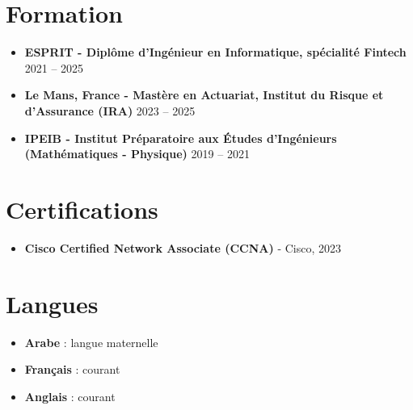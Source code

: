 \documentclass[10pt,a4paper]{article}
\begin{document}
\section{Formation}
\begin{itemize}
    \item \textbf{ESPRIT - Diplôme d'Ingénieur en Informatique, spécialité Fintech} \hfill 2021 -- 2025
    \item \textbf{Le Mans, France - Mastère en Actuariat, Institut du Risque et d'Assurance (IRA)} \hfill 2023 -- 2025
    \item \textbf{IPEIB - Institut Préparatoire aux Études d'Ingénieurs (Mathématiques - Physique)} \hfill 2019 -- 2021
\end{itemize}

\section{Certifications}
\begin{itemize}
    \item \textbf{Cisco Certified Network Associate (CCNA)} - Cisco, 2023
\end{itemize}

\section{Langues}
\begin{itemize}
    \item \textbf{Arabe} : langue maternelle
    \item \textbf{Français} : courant
    \item \textbf{Anglais} : courant
\end{itemize}
\end{document}

